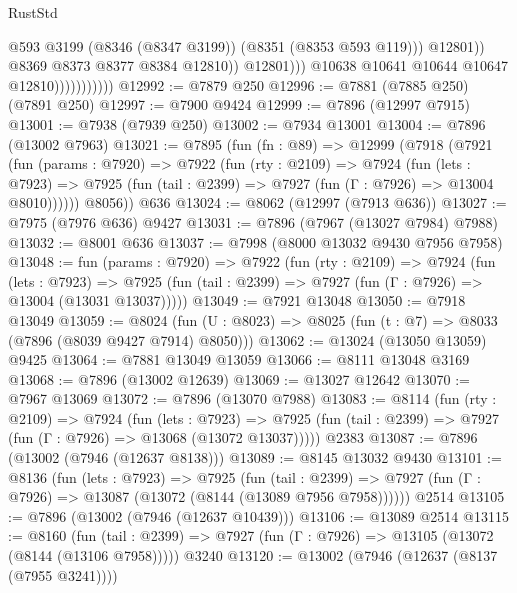 \begin{lexlean}{RustStd}
\begin{coremodule}
                                          @593
                                          @3199
                                          (@8346 (@8347 @3199))
                                          (@8351 (@8353 @593 @119)))
                                        @12801))
                                    @8369
                                    @8373
                                    @8377
                                    @8384
                                    @12810))
                                @12801)))
                          @10638
                          @10641
                          @10644
                          @10647
                          @12810)))))))))))
@12992 := @7879 @250
@12996 := @7881 (@7885 @250) (@7891 @250)
@12997 := @7900 @9424
@12999 := @7896 (@12997 @7915)
@13001 := @7938 (@7939 @250)
@13002 := @7934 @13001
@13004 := @7896 (@13002 @7963)
@13021 := @7895
    (fun (fn : @89) =>
    @12999
      (@7918
        (@7921
          (fun (params : @7920) =>
          @7922
            (fun (rty : @2109) =>
            @7924
              (fun (lets : @7923) =>
              @7925 (fun (tail : @2399) => @7927 (fun (Γ : @7926) => @13004 @8010))))))
        @8056))
    @636
@13024 := @8062 (@12997 (@7913 @636))
@13027 := @7975 (@7976 @636) @9427
@13031 := @7896 (@7967 (@13027 @7984) @7988)
@13032 := @8001 @636
@13037 := @7998 (@8000 @13032 @9430 @7956 @7958)
@13048 := fun (params : @7920) =>
  @7922
    (fun (rty : @2109) =>
    @7924
      (fun (lets : @7923) =>
      @7925 (fun (tail : @2399) => @7927 (fun (Γ : @7926) => @13004 (@13031 @13037)))))
@13049 := @7921 @13048
@13050 := @7918 @13049
@13059 := @8024 (fun (U : @8023) => @8025 (fun (t : @7) => @8033 (@7896 (@8039 @9427 @7914) @8050)))
@13062 := @13024 (@13050 @13059) @9425
@13064 := @7881 @13049 @13059
@13066 := @8111 @13048 @3169
@13068 := @7896 (@13002 @12639)
@13069 := @13027 @12642
@13070 := @7967 @13069
@13072 := @7896 (@13070 @7988)
@13083 := @8114
    (fun (rty : @2109) =>
    @7924
      (fun (lets : @7923) =>
      @7925 (fun (tail : @2399) => @7927 (fun (Γ : @7926) => @13068 (@13072 @13037)))))
    @2383
@13087 := @7896 (@13002 (@7946 (@12637 @8138)))
@13089 := @8145 @13032 @9430
@13101 := @8136
    (fun (lets : @7923) =>
    @7925
      (fun (tail : @2399) =>
      @7927 (fun (Γ : @7926) => @13087 (@13072 (@8144 (@13089 @7956 @7958))))))
    @2514
@13105 := @7896 (@13002 (@7946 (@12637 @10439)))
@13106 := @13089 @2514
@13115 := @8160
    (fun (tail : @2399) => @7927 (fun (Γ : @7926) => @13105 (@13072 (@8144 (@13106 @7958)))))
    @3240
@13120 := @13002 (@7946 (@12637 (@8137 (@7955 @3241))))

\end{coremodule}
\end{lexlean}
